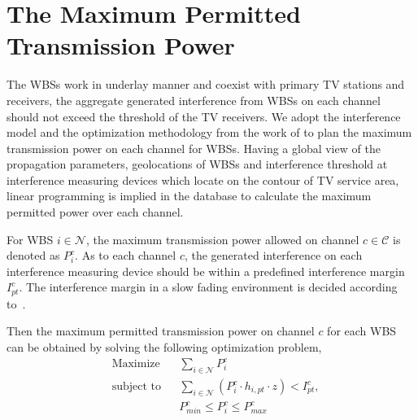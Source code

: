 

\section{The Maximum Permitted Transmission Power}
\label{powermap}
The WBSs work in underlay manner and coexist with primary TV stations and receivers, the aggregate generated interference from WBSs on each channel should not exceed the threshold of the TV receivers.
We adopt the interference model and the optimization methodology from the work of \cite{multipleIntf_pimrc11} to plan the maximum transmission power on each channel for WBSs.
Having a global view of the propagation parameters, geolocations of WBSs and interference threshold at interference measuring devices which locate on the contour of TV service area, linear programming is implied in the database to calculate the maximum permitted power over each channel.

For WBS $i\in \mathcal{N}$, the maximum transmission power allowed on channel $c\in \mathcal{C}$ is denoted as $P_i^c$. 
As to each channel $c$, the generated interference on each interference measuring device should be within a predefined interference margin $I^c_{pt}$.
The interference margin in a slow fading environment is decided according to~\cite{aggregate_interference_shadow_fading_2010}.

Then the maximum permitted transmission power on channel $c$ for each WBS can be obtained by solving the following optimization problem,
	\begin{equation}
\label{lp}
		\begin{aligned}
		& {\text{Maximize}}
		& & \sum_{i\in \mathcal{N}} P^c_i \\
		& \text{subject to}
		& & \sum_{i\in \mathcal{N}} (P^c_i \cdot h_{i,pt}\cdot z) < I^c_{pt},\\
		& & & P_{min}^c \leq P_i^c \leq P_{max}^c		
		\end{aligned}
	\end{equation}
	
